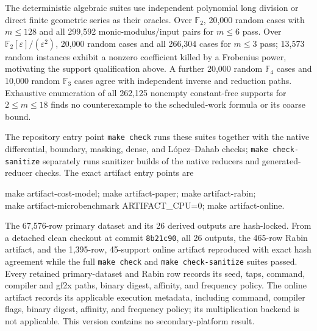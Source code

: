\documentclass{mcom-l}
\numberwithin{equation}{section}
\theoremstyle{definition}
\theoremstyle{remark}
\newcommand{\Ftwo}{\mathbb{F}_2}
\begin{document}
The deterministic algebraic suites use independent polynomial long division
or direct finite geometric series as their oracles.  Over $\Ftwo$, 20,000
random cases with $m\le128$ and all 299,592 monic-modulus/input pairs for
$m\le6$ pass.  Over $\Ftwo[\varepsilon]/(\varepsilon^2)$, 20,000 random cases
and all 266,304 cases for $m\le3$ pass; 13,573 random instances exhibit a
nonzero coefficient killed by a Frobenius power, motivating the support
qualification above.  A further 20,000 random $\mathbb F_4$ cases and 10,000
random $\mathbb F_3$ cases agree with independent inverse and reduction paths.
Exhaustive enumeration of all 262,125 nonempty constant-free supports for
$2\le m\le18$ finds no counterexample to the scheduled-work formula or its
coarse bound.

The repository entry point \texttt{make check} runs these suites together with
the native differential, boundary, masking, dense, and L\'opez--Dahab checks;
\texttt{make check-sanitize} separately runs sanitizer builds of the native
reducers and generated-reducer checks.  The exact artifact entry points are
\begin{center}
\small\ttfamily
make artifact-cost-model; make artifact-paper; make artifact-rabin;\\
make artifact-microbenchmark ARTIFACT\_CPU=0; make artifact-online.
\end{center}
The 67,576-row primary dataset and its 26 derived outputs are hash-locked.  From
a detached clean checkout at commit \texttt{8b21c90}, all 26 outputs, the
465-row Rabin artifact, and the 1,395-row, 45-support online artifact reproduced
with exact hash agreement while the full \texttt{make check} and
\texttt{make check-sanitize} suites passed.  Every
retained primary-dataset and Rabin row records its seed, taps, command,
compiler and gf2x paths, binary digest, affinity, and frequency policy.  The
online artifact records its applicable execution metadata, including command,
compiler flags, binary digest, affinity, and frequency policy; its
multiplication backend is not applicable.  This version contains no
secondary-platform result.
\end{document}
